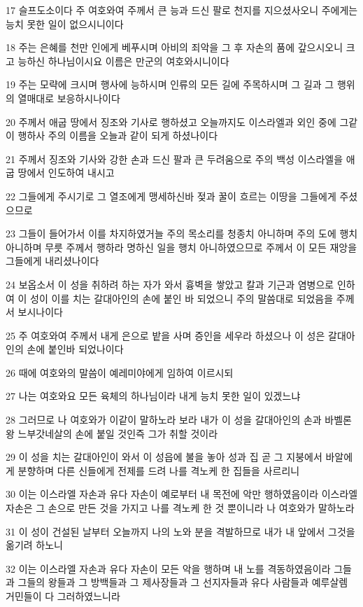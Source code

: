 \par 17 슬프도소이다 주 여호와여 주께서 큰 능과 드신 팔로 천지를 지으셨사오니 주에게는 능치 못한 일이 없으시니이다
\par 18 주는 은혜를 천만 인에게 베푸시며 아비의 죄악을 그 후 자손의 품에 갚으시오니 크고 능하신 하나님이시요 이름은 만군의 여호와시니이다
\par 19 주는 모략에 크시며 행사에 능하시며 인류의 모든 길에 주목하시며 그 길과 그 행위의 열매대로 보응하시나이다
\par 20 주께서 애굽 땅에서 징조와 기사로 행하셨고 오늘까지도 이스라엘과 외인 중에 그같이 행하사 주의 이름을 오늘과 같이 되게 하셨나이다
\par 21 주께서 징조와 기사와 강한 손과 드신 팔과 큰 두려움으로 주의 백성 이스라엘을 애굽 땅에서 인도하여 내시고
\par 22 그들에게 주시기로 그 열조에게 맹세하신바 젖과 꿀이 흐르는 이땅을 그들에게 주셨으므로
\par 23 그들이 들어가서 이를 차지하였거늘 주의 목소리를 청종치 아니하며 주의 도에 행치 아니하며 무릇 주께서 행하라 명하신 일을 행치 아니하였으므로 주께서 이 모든 재앙을 그들에게 내리셨나이다
\par 24 보옵소서 이 성을 취하려 하는 자가 와서 흉벽을 쌓았고 칼과 기근과 염병으로 인하여 이 성이 이를 치는 갈대아인의 손에 붙인 바 되었으니 주의 말씀대로 되었음을 주께서 보시나이다
\par 25 주 여호와여 주께서 내게 은으로 밭을 사며 증인을 세우라 하셨으나 이 성은 갈대아인의 손에 붙인바 되었나이다
\par 26 때에 여호와의 말씀이 예레미야에게 임하여 이르시되
\par 27 나는 여호와요 모든 육체의 하나님이라 내게 능치 못한 일이 있겠느냐
\par 28 그러므로 나 여호와가 이같이 말하노라 보라 내가 이 성을 갈대아인의 손과 바벨론 왕 느부갓네살의 손에 붙일 것인즉 그가 취할 것이라
\par 29 이 성을 치는 갈대아인이 와서 이 성읍에 불을 놓아 성과 집 곧 그 지붕에서 바알에게 분향하며 다른 신들에게 전제를 드려 나를 격노케 한 집들을 사르리니
\par 30 이는 이스라엘 자손과 유다 자손이 예로부터 내 목전에 악만 행하였음이라 이스라엘 자손은 그 손으로 만든 것을 가지고 나를 격노케 한 것 뿐이니라 나 여호와가 말하노라
\par 31 이 성이 건설된 날부터 오늘까지 나의 노와 분을 격발하므로 내가 내 앞에서 그것을 옮기려 하노니
\par 32 이는 이스라엘 자손과 유다 자손이 모든 악을 행하며 내 노를 격동하였음이라 그들과 그들의 왕들과 그 방백들과 그 제사장들과 그 선지자들과 유다 사람들과 예루살렘 거민들이 다 그러하였느니라
